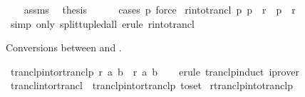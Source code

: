\begin{isabellebody}
\ \ \isamarkupfalse%
\ assms\ \isamarkupfalse%
\ {\isacharquery}{\kern0pt}thesis\isanewline
\ \ \ \ \isamarkupfalse%
\ {\isacharparenleft}{\kern0pt}cases\ p{\isacharparenright}{\kern0pt}\ force\isanewline
{}\isamarkupfalse%
%
\endisatagproof
{\isafoldproof}%
%
\isadelimproof
\isanewline
%
\endisadelimproof
\isanewline
{}\isamarkupfalse%
\ r{\isacharunderscore}{\kern0pt}into{\isacharunderscore}{\kern0pt}trancl{\isacharprime}{\kern0pt}{\isacharcolon}{\kern0pt}\ {\isachardoublequoteopen}{\isasymAnd}p{\isachardot}{\kern0pt}\ p\ {\isasymin}\ r\ {\isasymLongrightarrow}\ p\ {\isasymin}\ r\isactrlsup {\isacharplus}{\kern0pt}{\isachardoublequoteclose}\isanewline
%
\isadelimproof
\ \ %
\endisadelimproof
%
\isatagproof
{}\isamarkupfalse%
\ {\isacharparenleft}{\kern0pt}simp\ only{\isacharcolon}{\kern0pt}\ split{\isacharunderscore}{\kern0pt}tupled{\isacharunderscore}{\kern0pt}all{\isacharparenright}{\kern0pt}\ {\isacharparenleft}{\kern0pt}erule\ r{\isacharunderscore}{\kern0pt}into{\isacharunderscore}{\kern0pt}trancl{\isacharparenright}{\kern0pt}%
\endisatagproof
{\isafoldproof}%
%
\isadelimproof
%
\endisadelimproof
%
\begin{isamarkuptext}%
\medskip Conversions between  and .%
\end{isamarkuptext}\isamarkuptrue%
\isamarkupfalse%
\ tranclp{\isacharunderscore}{\kern0pt}into{\isacharunderscore}{\kern0pt}rtranclp{\isacharcolon}{\kern0pt}\ {\isachardoublequoteopen}r\isactrlsup {\isacharplus}{\kern0pt}\isactrlsup {\isacharplus}{\kern0pt}\ a\ b\ {\isasymLongrightarrow}\ r\isactrlsup {\isacharasterisk}{\kern0pt}\isactrlsup {\isacharasterisk}{\kern0pt}\ a\ b{\isachardoublequoteclose}\isanewline
%
\isadelimproof
\ \ %
\endisadelimproof
%
\isatagproof
{}\isamarkupfalse%
\ {\isacharparenleft}{\kern0pt}erule\ tranclp{\isachardot}{\kern0pt}induct{\isacharparenright}{\kern0pt}\ iprover{\isacharplus}{\kern0pt}%
\endisatagproof
{\isafoldproof}%
%
\isadelimproof
\isanewline
%
\endisadelimproof
\isanewline
{}\isamarkupfalse%
\ trancl{\isacharunderscore}{\kern0pt}into{\isacharunderscore}{\kern0pt}rtrancl\ {\isacharequal}{\kern0pt}\ tranclp{\isacharunderscore}{\kern0pt}into{\isacharunderscore}{\kern0pt}rtranclp\ {\isacharbrackleft}{\kern0pt}to{\isacharunderscore}{\kern0pt}set{\isacharbrackright}{\kern0pt}\isanewline
\isanewline
{}\isamarkupfalse%
\ rtranclp{\isacharunderscore}{\kern0pt}into{\isacharunderscore}{\kern0pt}tranclp{}{\isacharcolon}{\kern0pt}\isanewline

\end{isabellebody}
